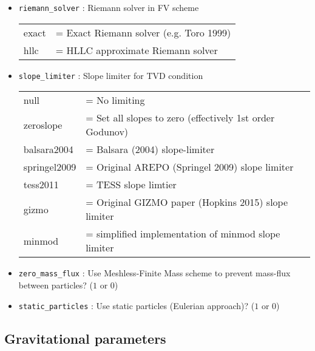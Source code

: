 \documentclass[a4paper]{article}
\newcommand{\var}[1]{\texttt{#1}}
\begin{document}
\begin{itemize}

\item \var{riemann\_solver} : Riemann solver in FV scheme \\
\begin{tabular}{ll}
exact  & = Exact Riemann solver (e.g. Toro 1999) \\
hllc & = HLLC approximate Riemann solver
\end{tabular}

\item \var{slope\_limiter} : Slope limiter for TVD condition \\
\begin{tabular}{ll}
null          & = No limiting \\
zeroslope     & = Set all slopes to zero (effectively 1st order Godunov) \\
balsara2004   & = Balsara (2004) slope-limiter \\
springel2009  & = Original AREPO (Springel 2009) slope limiter \\
tess2011      & = TESS slope limtier \\
gizmo         & = Original GIZMO paper (Hopkins 2015) slope limiter \\
minmod        & = simplified implementation of minmod slope limiter
\end{tabular}

\item \var{zero\_mass\_flux} : Use Meshless-Finite Mass scheme to prevent mass-flux between particles?   ($1$ or $0$)
\item \var{static\_particles} : Use static particles (Eulerian approach)?  ($1$ or $0$)

\end{itemize}



\subsection{Gravitational parameters}
\end{document}
